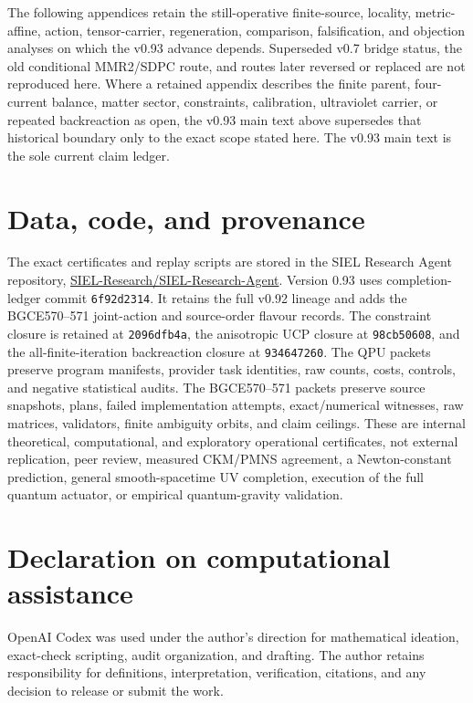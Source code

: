 \documentclass[11pt]{article}
\theoremstyle{definition}
\theoremstyle{remark}
\begin{document}
The following appendices retain the still-operative finite-source, locality, metric-affine, action, tensor-carrier, regeneration, comparison, falsification, and objection analyses on which the v0.93 advance depends. Superseded v0.7 bridge status, the old conditional MMR2/SDPC route, and routes later reversed or replaced are not reproduced here. Where a retained appendix describes the finite parent, four-current balance, matter sector, constraints, calibration, ultraviolet carrier, or repeated backreaction as open, the v0.93 main text above supersedes that historical boundary only to the exact scope stated here. The v0.93 main text is the sole current claim ledger.



\section*{Data, code, and provenance}

The exact certificates and replay scripts are stored in the SIEL Research Agent repository,
\href{https://github.com/SIEL-Research/SIEL-Research-Agent}{SIEL-Research/SIEL-Research-Agent}. Version 0.93 uses completion-ledger commit \texttt{6f92d2314}. It retains the full v0.92 lineage and adds the BGCE570--571 joint-action and source-order flavour records. The constraint closure is retained at \texttt{2096dfb4a}, the anisotropic UCP closure at \texttt{98cb50608}, and the all-finite-iteration backreaction closure at \texttt{934647260}. The QPU packets preserve program manifests, provider task identities, raw counts, costs, controls, and negative statistical audits. The BGCE570--571 packets preserve source snapshots, plans, failed implementation attempts, exact/numerical witnesses, raw matrices, validators, finite ambiguity orbits, and claim ceilings. These are internal theoretical, computational, and exploratory operational certificates, not external replication, peer review, measured CKM/PMNS agreement, a Newton-constant prediction, general smooth-spacetime UV completion, execution of the full quantum actuator, or empirical quantum-gravity validation.

\section*{Declaration on computational assistance}

OpenAI Codex was used under the author's direction for mathematical ideation, exact-check scripting, audit organization, and drafting. The author retains responsibility for definitions, interpretation, verification, citations, and any decision to release or submit the work.
\end{document}
